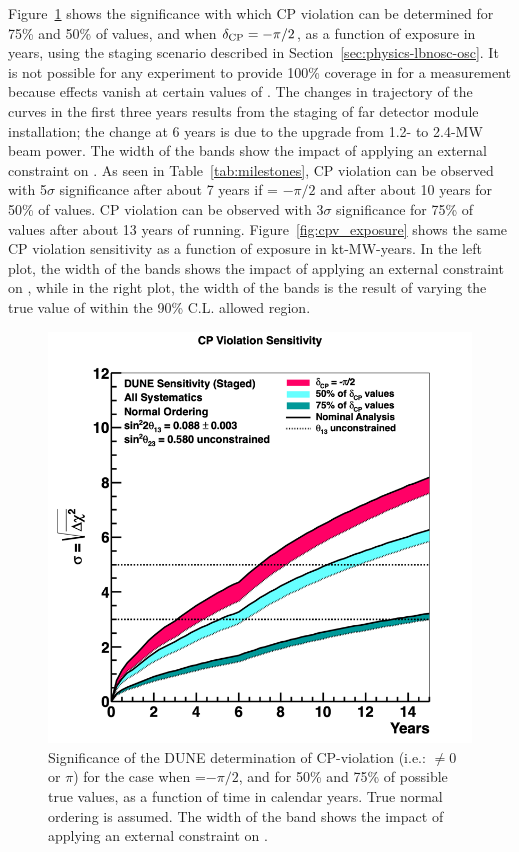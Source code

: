 Figure~\ref{fig:cpv_staging} shows the significance
with which CP violation can be determined for 75\% and 50\% of \deltacp values, and when $\delta_{\rm CP}=-\pi/2$, as a function of exposure in years, using the staging scenario described in Section~\ref{sec:physics-lbnosc-osc}. It is not possible for any experiment to provide 100\% coverage in \deltacp for a  measurement because  effects vanish at certain values of \deltacp. The changes in trajectory of the curves in the first three years results from the staging of far detector module installation; the change at 6 years is due to the upgrade from 1.2- to 2.4-MW beam power. The width of the bands show the impact of applying an external constraint on . As seen in Table~\ref{tab:milestones}, CP violation can be observed with 5$\sigma$ significance after about 7 years if \deltacp = $-\pi/2$ and after about 10 years for 50\% of \deltacp values. CP violation can be observed with 3$\sigma$ significance for 75\% of \deltacp values after about 13 years of running. Figure~\ref{fig:cpv_exposure} shows the same CP violation sensitivity as a function of exposure in kt-MW-years. In the left plot, the width of the bands shows the impact of applying an external constraint on , while in the right plot, the width of the bands is the result of varying the true value of  within the  90\% C.L. allowed region.

\begin{figure}[h!]
    \centering
		\includegraphics[width=0.95\linewidth]{graphics/cpv_exp_staging_varyconstr_nh_2019_v4.png}
	\caption[Significance of the DUNE determination of CP-violation as a function of time]{Significance of the DUNE determination of CP-violation (i.e.: \deltacp $\neq 0$ or $\pi$) for the case when \deltacp=$-\pi/2$, and for 50\% and 75\% of possible true \deltacp values, as a function of time in calendar years. True normal ordering is assumed. The width of the band shows the impact of applying an external constraint on .}
    \label{fig:cpv_staging}
\end{figure}

